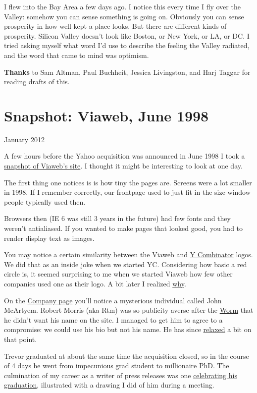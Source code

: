 \documentclass[12pt]{book}
\begin{document}
I flew into the Bay Area a few days ago. I notice this every time I fly
over the Valley: somehow you can sense something is going on. Obviously
you can sense prosperity in how well kept a place looks. But there are
different kinds of prosperity. Silicon Valley doesn't look like Boston,
or New York, or LA, or DC. I tried asking myself what word I'd use to
describe the feeling the Valley radiated, and the word that came to mind
was optimism.


\textbf{Thanks} to Sam Altman, Paul Buchheit, Jessica Livingston, and
Harj Taggar for reading drafts of this.
\chapter{Snapshot: Viaweb, June 1998}

January 2012

A few hours before the Yahoo acquisition was announced in June 1998 I
took a \href{http://ycombinator.com/viaweb}{snapshot of Viaweb's site}.
I thought it might be interesting to look at one day.

The first thing one notices is is how tiny the pages are. Screens were a
lot smaller in 1998. If I remember correctly, our frontpage used to just
fit in the size window people typically used then.

Browsers then (IE 6 was still 3 years in the future) had few fonts and
they weren't antialiased. If you wanted to make pages that looked good,
you had to render display text as images.

You may notice a certain similarity between the Viaweb and
\href{http://ycombinator.com}{Y Combinator} logos. We did that as an
inside joke when we started YC. Considering how basic a red circle is,
it seemed surprising to me when we started Viaweb how few other
companies used one as their logo. A bit later I realized
\href{zero.html}{why}.

On the \href{http://www.ycombinator.com/viaweb/com.html}{Company page}
you'll notice a mysterious individual called John McArtyem. Robert
Morris (aka Rtm) was so publicity averse after the
\href{http://en.wikipedia.org/wiki/Morris_worm}{Worm} that he didn't
want his name on the site. I managed to get him to agree to a
compromise: we could use his bio but not his name. He has since
\href{http://ycombinator.com/people.html}{relaxed} a bit on that point.

Trevor graduated at about the same time the acquisition closed, so in
the course of 4 days he went from impecunious grad student to
millionaire PhD. The culmination of my career as a writer of press
releases was one
\href{http://ycombinator.com/viaweb/trevor.html}{celebrating his
graduation}, illustrated with a drawing I did of him during a meeting.
\end{document}
